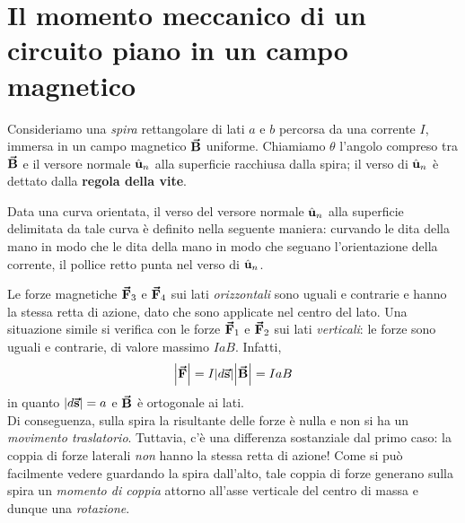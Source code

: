 \section{Il momento meccanico di un circuito piano in un campo magnetico}
Consideriamo una \textit{spira} rettangolare di lati $a$ e $b$ percorsa da una corrente $I$, immersa in un campo magnetico $\vb*{\va{B}}$ uniforme. Chiamiamo $\theta$ l'angolo compreso tra $\vb*{\va{B}}$ e il versore normale $\hat{\mathbf{u}}_n$ alla superficie racchiusa dalla spira; il verso di $\hat{\mathbf{u}}_n$ è dettato dalla \textbf{regola della vite}.
\begin{define}
	Data una curva orientata, il verso del versore normale $\hat{\mathbf{u}}_n$ alla superficie delimitata da tale curva è definito nella seguente maniera: curvando le dita della mano in modo che le dita della mano in modo che seguano l'orientazione della corrente, il pollice retto punta nel verso di $\hat{\mathbf{u}}_n$.
\end{define}
Le forze magnetiche $\vb*{\va{F}}_3$ e $\vb*{\va{F}}_4$ sui lati \textit{orizzontali} sono uguali e contrarie e hanno la stessa retta di azione, dato che sono applicate nel centro del lato.
Una situazione simile si verifica con le forze $\vb*{\va{F}}_{1}$ e $\vb*{\va{F}}_2$ sui lati \textit{verticali}: le forze sono uguali e contrarie, di valore massimo $IaB$. Infatti,
	\begin{equation*}
		\abs{\vb*{\va{F}}}=I\abs{d\vb*{\va{s}}}\abs{\vb*{\va{B}}}=IaB
	\end{equation*}
in quanto $\abs{d\vb*{\va{s}}}=a$ e $\vb*{\va{B}}$ è ortogonale ai lati.\\ 
Di conseguenza, sulla spira la risultante delle forze è nulla e non si ha un \textit{movimento traslatorio}.
Tuttavia, c'è una differenza sostanziale dal primo caso: la coppia di forze laterali \textit{non} hanno la stessa retta di azione! Come si può facilmente vedere guardando la spira dall'alto, tale coppia di forze generano sulla spira un \textit{momento di coppia} attorno all'asse verticale del centro di massa e dunque una \textit{rotazione}.

